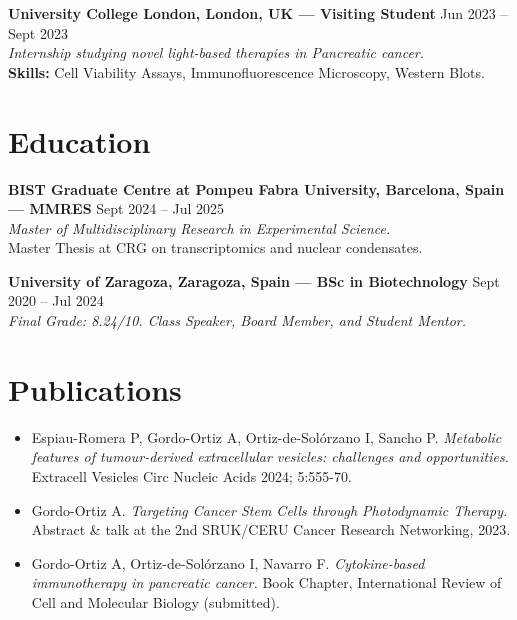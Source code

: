 \documentclass[a4paper,10pt]{article}
\begin{document}
\vspace{10pt}

\noindent\textbf{University College London, London, UK — Visiting Student} \hfill Jun 2023 – Sept 2023 \\
\textit{Internship studying novel light-based therapies in Pancreatic cancer.} \\
\textbf{Skills:} Cell Viability Assays, Immunofluorescence Microscopy, Western Blots.

\vspace{10pt}

\section*{Education}

\noindent\textbf{BIST Graduate Centre at Pompeu Fabra University, Barcelona, Spain — MMRES} \hfill Sept 2024 – Jul 2025 \\
\textit{Master of Multidisciplinary Research in Experimental Science.} \\
Master Thesis at CRG on transcriptomics and nuclear condensates.

\vspace{10pt}

\noindent\textbf{University of Zaragoza, Zaragoza, Spain — BSc in Biotechnology} \hfill Sept 2020 – Jul 2024 \\
\textit{Final Grade: 8.24/10. Class Speaker, Board Member, and Student Mentor.}

\vspace{10pt}

\section*{Publications}

\begin{itemize}[leftmargin=1.5em]
    \item Espiau-Romera P, Gordo-Ortiz A, Ortiz-de-Solórzano I, Sancho P. \textit{Metabolic features of tumour-derived extracellular vesicles: challenges and opportunities.} Extracell Vesicles Circ Nucleic Acids 2024; 5:555-70.
    \item Gordo-Ortiz A. \textit{Targeting Cancer Stem Cells through Photodynamic Therapy.} Abstract \& talk at the 2nd SRUK/CERU Cancer Research Networking, 2023.
    \item Gordo-Ortiz A, Ortiz-de-Solórzano I, Navarro F. \textit{Cytokine-based immunotherapy in pancreatic cancer.} Book Chapter, International Review of Cell and Molecular Biology (submitted).
\end{itemize}
\end{document}
